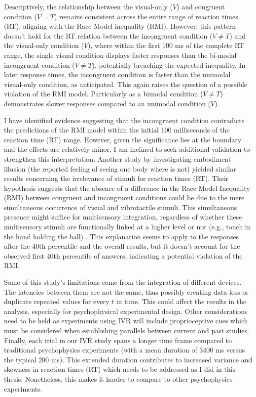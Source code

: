 \documentclass[12pt,oneside,openright]{report}
\begin{document}
Descriptively, the relationship between the visual-only ($V$) and congruent condition ($V=T$) remains consistent across the entire range of reaction times (RT), aligning with the Race Model inequality (RMI). However, this pattern doesn’t hold for the RT relation between the incongruent condition ($V \neq T$) and the visual-only condition ($V$), where within the first 100 ms of the complete RT range, the single visual condition displays faster responses than the bi-modal incongruent condition ($V \neq T$), potentially breaching the expected inequality. In later response times, the incongruent condition is faster than the unimodal visual-only condition, as anticipated. This again raises the question of a possible violation of the RMI model. Particularly as a bimodal condition ($V \neq T$) demonstrates slower responses compared to an unimodal condition ($V$).

I have identified evidence suggesting that the incongruent condition contradicts the predictions of the RMI model within the initial 100 milliseconds of the reaction time (RT) range. However, given the significance lies at the boundary and the effects are relatively minor, I am inclined to seek additional validation to strengthen this interpretation. Another study by \cite{RSE_FBI} investigating embodiment illusion (the reported feeling of seeing one body where is not) yielded similar results concerning the irrelevance of stimuli for reaction times (RT). Their hypothesis suggests that the absence of a difference in the Race Model Inequality (RMI) between congruent and incongruent conditions could be due to the mere simultaneous occurrence of visual and vibrotactile stimuli. This simultaneous presence might suffice for multisensory integration, regardless of whether these multisensory stimuli are functionally linked at a higher level or not (e.g., touch in the hand holding the ball) \parencite{RSE_FBI}. This explanation seems to apply to the responses after the 40th percentile and the overall results, but it doesn't account for the observed first 40th percentile of answers, indicating a potential violation of the RMI.

Some of this study's limitations come from the integration of different devices. The latencies between them are not the same, thus possibly creating data loss or duplicate repeated values for every $t$ in time. This could affect the results in the analysis, especially for psychophysical experimental design. Other considerations need to be held as experiments using IVR will include proprioceptive cues which must be considered when establishing parallels between current and past studies. Finally, each trial in our IVR study spans a longer time frame compared to traditional psychophysics experiments (with a mean duration of 3400 ms versus the typical 200 ms). This extended duration contributes to increased variance and skewness in reaction times (RT) which needs to be addressed as I did in this thesis. Nonetheless, this makes it harder to compare to other psychophysics experiments. 
\end{document}
